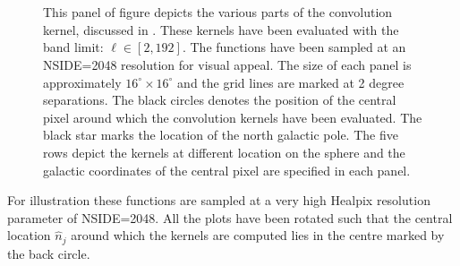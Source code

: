 \begin{figure}[t]
\hspace{-2mm}
\\[-2ex]
\hspace{-2mm}
\hspace{-2mm}
\hspace{-2mm}
\hspace{-2mm}
\hspace{-2mm}
\\[-2ex]
\hspace{-2mm}
\hspace{-2mm}
\hspace{-2mm}
\hspace{-2mm}
\hspace{-2mm}
\caption{This panel of figure depicts the various parts of the convolution kernel, discussed in . These kernels have been evaluated with the band limit: $\ell \in [2,192]$. The functions have been sampled at an NSIDE=2048 resolution for visual appeal. The size of each panel is approximately $16^{\circ} \times 16^{\circ}$ and the grid lines are marked at 2 degree separations. The black circles denotes the position of the central pixel around which the convolution kernels have been evaluated. The black star marks the location of the north galactic pole. The five rows depict the kernels at different location on the sphere and the galactic coordinates of the central pixel are specified in each panel. }
\label{fig:vis_kernel}
 \end{figure}
%
For illustration these functions are sampled at a very high Healpix resolution parameter of NSIDE=2048. All the plots have been rotated such that the central location $\hat{n}_j$ around which the kernels are computed lies in the centre marked by the back circle. 

